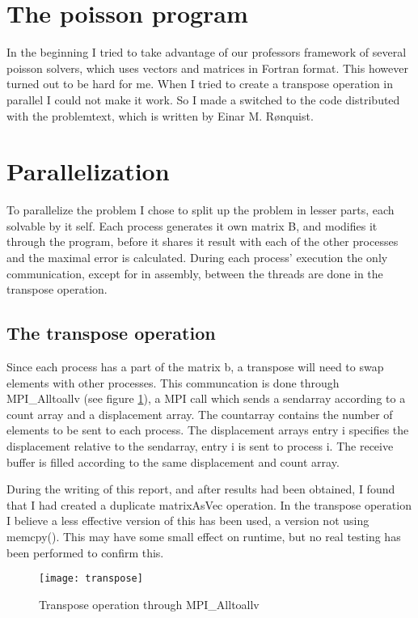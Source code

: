 

\section{The poisson program}
In the beginning I tried to take advantage of our professors framework of several poisson solvers, which uses vectors and matrices in Fortran format. This however turned out to be hard for me. When I tried to create a transpose operation in parallel I could not make it work. So I made a switched to the code distributed with the problemtext, which is written by Einar M. Rønquist. 

\section{Parallelization}
To parallelize the problem I chose to split up the problem in lesser parts, each solvable by it self. Each process generates it own matrix B, and modifies it through the program, before it shares it result with each of the other processes and the maximal error is calculated. During each process' execution the only communication, except for in assembly, between the threads are done in the transpose operation.

\subsection{The transpose operation}
Since each process has a part of the matrix b, a transpose will need to swap elements with other processes. This communcation is done through MPI\_Alltoallv (see figure \ref{fig:transpose}), a MPI call which sends a sendarray according to a count array and a displacement array. The countarray contains the number of elements to be sent to each process. The displacement arrays entry i specifies the displacement relative to the sendarray, entry i is sent to process i. The receive buffer is filled according to the same displacement and count array. 

During the writing of this report, and after results had been obtained, I found that I had created a duplicate matrixAsVec operation. In the transpose operation I believe a less effective version of this has been used, a version not using memcpy(). This may have some small effect on runtime, but no real testing has been performed to confirm this.

\begin{figure}[htbp]
	\centering
	\texttt{[image: transpose]}
	\caption{Transpose operation through MPI\_Alltoallv}
	\label{fig:transpose}
\end{figure}


